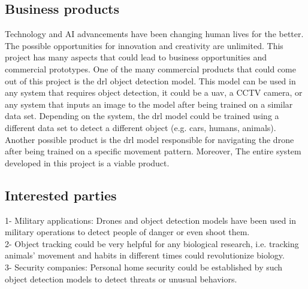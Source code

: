 \documentclass[../main.tex]{subfiles}
\begin{document}
\subsection{Business products}
	Technology and AI advancements have been changing human lives for the better. The possible opportunities for innovation and creativity are unlimited.
	This project has many aspects that could lead to business opportunities and commercial prototypes. 
	One of the many commercial products that could come out of this project is the \gls{drl} object detection model. This model can be used in any system that requires object detection, it could be a \gls{uav}, a CCTV camera, or any system that inputs an image to the model after being trained on a similar data set.
	Depending on the system, the \gls{drl} model could be trained using a different data set to detect a different object (e.g. cars, humans, animals).
	Another possible product is the \gls{drl} model responsible for navigating the drone after being trained on a specific movement pattern.
	Moreover, The entire system developed in this project is a viable product.

\subsection{Interested parties}
	1- Military applications: Drones and object detection models have been used in military operations to detect people of danger or even shoot them.\\
	2- Object tracking could be very helpful for any biological research, i.e. tracking animals' movement and habits in different times could revolutionize biology. \\ 
	3- Security companies: Personal home security could be established by such object detection models to detect threats or unusual behaviors.
\end{document}

